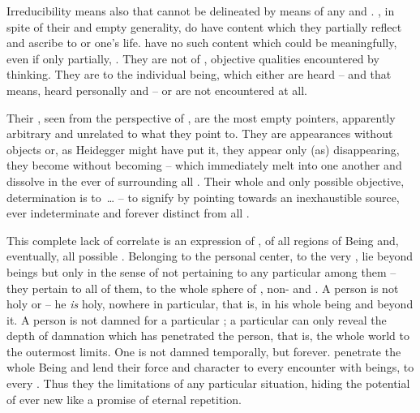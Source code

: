 
Irreducibility means also that  cannot be
delineated by means of any   and . 
, in spite of their  and empty generality, do have
content which they partially reflect and ascribe to
 or one's life.   have no such content
which could be meaningfully, even if only partially, . 
They are not  of , objective qualities 
encountered  by  thinking. They are 
 to the individual being,  which either are 
heard -- and that means, heard personally and  -- or are not
encountered at all. 

Their , seen from the perspective of , are the most
empty pointers, apparently arbitrary and unrelated to what they point
to.  They are appearances without objects or, as
Heidegger might have put it, they appear only (as) disappearing, they become
 without becoming  --  which immediately
melt into one another and dissolve in the ever   of
 surrounding all .  Their whole and only possible
objective,  determination is to~\ldots {} -- to {signify}
by pointing towards an inexhaustible source, ever indeterminate and forever
distinct from all .

\pa 
This complete lack of  correlate is an expression of
, of  all regions of Being and, eventually,
all possible . Belonging to the personal center, to the very
,  lie beyond beings but only in the sense of not
pertaining to any particular among them -- they pertain to all of them, to the
whole sphere of , non- and 
.  A person is not holy  or  -- he {\em is} holy, nowhere in particular, that is, in
his whole being and beyond it. A person is not damned for a particular ;
a particular  can only reveal the depth of damnation which has
penetrated the person, that is, the whole world to the outermost limits. One is
not damned temporally, but forever.   penetrate the whole Being
and lend their force and character to every encounter with beings, to every
. Thus they  the limitations of any particular
situation, hiding the  potential of ever new 
like a promise of eternal repetition.

